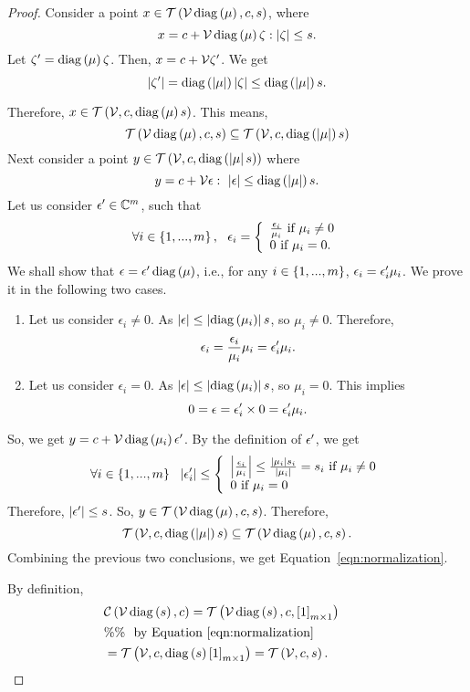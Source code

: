 %
\begin{proof}
Consider a point $x\in\mathit{\operatorname{\mathcal{T}}}\left(\mathcal{V}\operatorname{diag}\left(\mu\right),c,s\right)$,
where
%
\[
x=c+\mathcal{V}\operatorname{diag}\left(\mu\right)\zeta:\left|\zeta\right|\leq s.
\]
%
Let $\zeta^\prime=\operatorname{diag}\left(\mu\right)\zeta$.  Then, $x=c+\mathcal{V}\zeta^\prime$.
We get
%
\[
\left|\zeta^\prime\right|=\operatorname{diag}\left(\left|\mu\right|\right)\left|\zeta\right|\leq\operatorname{diag}\left(\left|\mu\right|\right)s.
\]

Therefore, ${x\in\mathit{\operatorname{\mathcal{T}}}\left(\mathcal{V},c,\operatorname{diag}\left(\mu\right)s\right)}$.  This
means,
%
\[
\mathit{\operatorname{\mathcal{T}}}\left(\mathcal{V}\operatorname{diag}\left(\mu\right),c,s\right)\subseteq\mathit{\operatorname{\mathcal{T}}}\left(\mathcal{V},c,\operatorname{diag}\left(\left|\mu\right|\right)s\right)
\]
%
Next consider a point
$y\in\mathit{\operatorname{\mathcal{T}}}\left(\mathcal{V},c,\operatorname{diag}\left(\left|\mu\right|s\right)\right)$ where
%
\[
y=c+\mathcal{V}\epsilon:~\left|\epsilon\right|\leq
\operatorname{diag}\left(\left|\mu\right|\right)s.
\]
%
Let us consider $\epsilon^\prime\in\mathbb{C}^m$, such that
%
\[\forall i\in\left\{1,...,m\right\},~~
\epsilon_i=\left\{
\begin{array}{l}
\frac{\epsilon_i}{\mu_i}~\text{if}~\mu_i\neq 0\\
0~\text{if}~\mu_i=0.
\end{array}
\right.
\]
%
We shall show that $\epsilon=\epsilon^\prime\operatorname{diag}\left(\mu\right)$, i.e., for
any $i\in\left\{1,...,m\right\}$, $\epsilon_i=\epsilon^\prime_i\mu_i$.  We prove
it in the following two cases.
\begin{enumerate}
\item Let us consider $\epsilon_i\neq 0$.  As
$\left|\epsilon\right|\leq\left|\operatorname{diag}\left(\mu_i\right)\right|s$, so
  $\mu_i\neq 0$.  Therefore,
  \[
  \epsilon_i=\frac{\epsilon_i}{\mu_i}\mu_i=\epsilon^\prime_i\mu_i.
  \]
\item Let us consider $\epsilon_i=0$.  As
$\left|\epsilon\right|\leq\left|\operatorname{diag}\left(\mu_i\right)\right|s$, so $\mu_i=
  0$.  This implies
  \[
  0=\epsilon=\epsilon^\prime_i\times
  0=\epsilon^\prime_i\mu_i.
  \]
\end{enumerate}
%
So, we get $y=c+\mathcal{V}\operatorname{diag}\left(\mu_i\right)\epsilon^\prime$.  By the definition of
$\epsilon^\prime$, we get
%
\[\forall i\in\left\{1,...,m\right\}~~
\left|\epsilon^\prime_i\right|\leq
\left\{
\begin{array}{l}
\left|\frac{\epsilon_i}{\mu_i}\right|\leq\frac{\left|\mu_i\right|s_i}{\left|\mu_i\right|}=s_i~\text{if}~\mu_i\neq
0\\
0~\text{if}~\mu_i=0
\end{array}
\right.
\]
%
Therefore, $\left|\epsilon^\prime\right|\leq s$.  So,
$y\in\mathit{\operatorname{\mathcal{T}}}\left(\mathcal{V}\operatorname{diag}\left(\mu\right),c,s\right)$.  Therefore,
%
\[
\mathit{\operatorname{\mathcal{T}}}\left(\mathcal{V},c,\operatorname{diag}\left(\left|\mu\right|\right)s\right)\subseteq\mathit{\operatorname{\mathcal{T}}}\left(\mathcal{V}\operatorname{diag}\left(\mu\right),c,s\right).
\]
%
Combining the previous two conclusions, we get
Equation~\ref{eqn:normalization}.

By definition,
%
\begin{align*}
& \mathit{\mathcal{C}}\left(\mathcal{V}\operatorname{diag}\left(s\right),c\right)=\mathit{\operatorname{\mathcal{T}}}\left(\mathcal{V}\operatorname{diag}\left(s\right),c,\left[1\right]_{m\times 1}\right)\\
& \%\%~~\text{by Equation~\ref{eqn:normalization}}\\
& =\mathit{\operatorname{\mathcal{T}}}\left(\mathcal{V},c,\operatorname{diag}\left({s}\right)\left[1\right]_{m\times 1}\right)=\mathit{\operatorname{\mathcal{T}}}\left(\mathcal{V},c,s\right).~\hspace{3em}\qedhere
\end{align*}
%
\end{proof}
%
